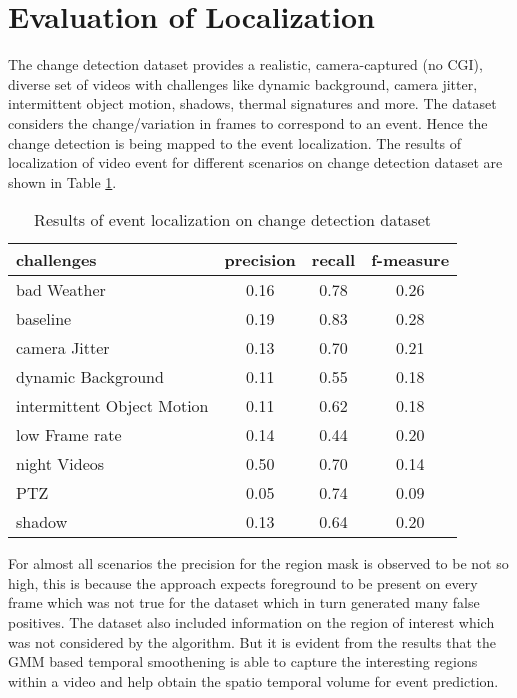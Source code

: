 \section{Evaluation of Localization}
\label{sec:EvLoc}
The change detection dataset \citep{cdnet} provides  a realistic, camera-captured (no CGI), diverse set of videos with challenges  like dynamic background, camera jitter, intermittent object motion, shadows, thermal signatures and more.  The dataset considers the change/variation in frames to correspond to an event. Hence the change detection is being mapped to the event localization. The results of localization of video event for different scenarios on change detection dataset are shown in Table \ref{tab:evalLoc}.
\begin{table}[htbp]
   \caption{Results of event localization on change detection dataset}
   \begin{center}
   \begin{tabular}{|l|c|c|c|} \hline
        \textbf{challenges} & \textbf{precision} & \textbf{recall} & \textbf{f-measure} \\ \hline
		bad Weather & 0.16 & 0.78 & 0.26\\
		baseline & 0.19 & 0.83 & 0.28\\
		camera Jitter & 0.13 & 0.70 & 0.21 \\
		dynamic Background & 0.11 & 0.55 &  0.18\\
		intermittent Object Motion & 0.11 & 0.62 & 0.18 \\
		low Frame rate & 0.14 & 0.44 & 0.20 \\
		night Videos & 0.50 & 0.70 & 0.14 \\
		PTZ & 0.05 & 0.74 & 0.09\\
		shadow & 0.13 & 0.64 & 0.20\\ \hline
   \end{tabular}
   \label{tab:evalLoc}
   \end{center}
 \end{table} 
\par For almost all scenarios the precision for the region mask is observed to be not so high, this is because the approach expects foreground to be present on every frame which was not true for the dataset which in turn generated many false positives.  The dataset also included information on the region of interest which was not considered by the algorithm. But it is evident from the results that the GMM based temporal smoothening is able to capture the interesting regions within a video and help obtain the spatio temporal volume for event prediction.

